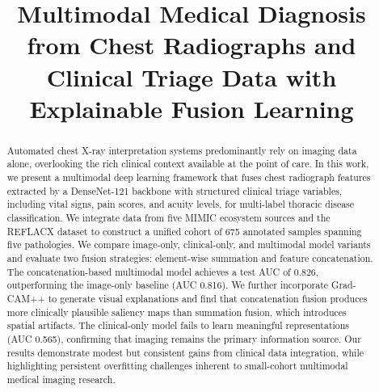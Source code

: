 \documentclass[conference]{IEEEtran}
\begin{document}
\title{Multimodal Medical Diagnosis from Chest Radiographs and Clinical Triage Data with Explainable Fusion Learning}

\author{
\and
{}
}

\maketitle

\begin{abstract}
Automated chest X-ray interpretation systems predominantly rely on imaging data alone, overlooking the rich clinical context available at the point of care. In this work, we present a multimodal deep learning framework that fuses chest radiograph features extracted by a DenseNet-121 backbone with structured clinical triage variables, including vital signs, pain scores, and acuity levels, for multi-label thoracic disease classification. We integrate data from five MIMIC ecosystem sources and the REFLACX dataset to construct a unified cohort of 675 annotated samples spanning five pathologies. We compare image-only, clinical-only, and multimodal model variants and evaluate two fusion strategies: element-wise summation and feature concatenation. The concatenation-based multimodal model achieves a test AUC of 0.826, outperforming the image-only baseline (AUC 0.816). We further incorporate Grad-CAM++ to generate visual explanations and find that concatenation fusion produces more clinically plausible saliency maps than summation fusion, which introduces spatial artifacts. The clinical-only model fails to learn meaningful representations (AUC 0.565), confirming that imaging remains the primary information source. Our results demonstrate modest but consistent gains from clinical data integration, while highlighting persistent overfitting challenges inherent to small-cohort multimodal medical imaging research.
\end{abstract}
\end{document}
